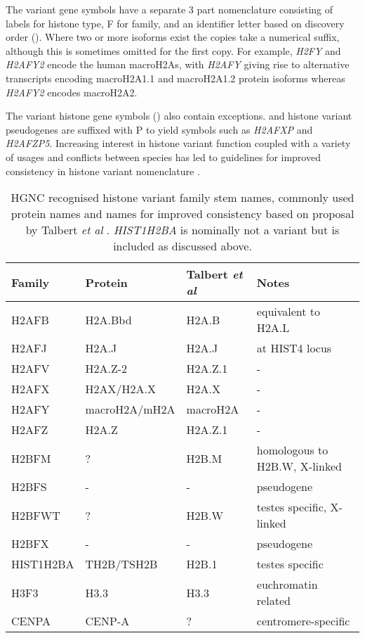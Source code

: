 	The variant gene symbols have a separate 3 part nomenclature 
	consisting of labels for histone type, F for family, 
	and an identifier letter based on discovery order ().
	Where two or more isoforms exist the copies take a numerical suffix, 
	although this is sometimes omitted for the first copy. 
	For example, \textit{H2FY} and \textit{H2AFY2} encode the human macroH2As, 
	with \textit{H2AFY} giving rise to alternative transcripts encoding macroH2A1.1 and macroH2A1.2 protein isoforms 
	whereas \textit{H2AFY2} encodes macroH2A2.

	The variant histone gene symbols () also contain exceptions.
	and histone variant pseudogenes are suffixed with P to yield symbols such as \textit{H2AFXP} and \textit{H2AFZP5}.
	Increasing interest in histone variant function \citep{MazeAllis2014}
	coupled with a variety of usages and conflicts between species 
	has led to guidelines for improved consistency in histone variant nomenclature \citep{Talbert2012}.

\begin{table*}[htp]
	\caption{HGNC recognised histone variant family stem names, commonly used protein names 
	and names for improved consistency based on proposal by Talbert \textit{et al} \citep{Talbert2012}. 
	\textit{HIST1H2BA} is nominally not a variant but is included as discussed above.}
	\label{tab:histone-variant-families}
	\centering
	\begin{tabular}{l l l l}
	\toprule
	Family & Protein & Talbert \textit{et al} & Notes \\
	\midrule
	H2AFB & H2A.Bbd & H2A.B & equivalent to H2A.L \\
	H2AFJ & H2A.J & H2A.J & at HIST4 locus \\
	H2AFV & H2A.Z-2 & H2A.Z.1 & - \\
	H2AFX & H2AX/H2A.X & H2A.X & - \\
	H2AFY & macroH2A/mH2A & macroH2A & - \\
	H2AFZ & H2A.Z & H2A.Z.1 & - \\
	H2BFM & ? & H2B.M & homologous to H2B.W, X-linked\\
	H2BFS & - & - & pseudogene \\
	H2BFWT & ? & H2B.W & testes specific, X-linked \\
	H2BFX & - & - & pseudogene \\
	HIST1H2BA & TH2B/TSH2B & H2B.1 & testes specific \\
	H3F3 & H3.3 & H3.3 & euchromatin related \\
	CENPA & CENP-A & ? & centromere-specific \\
	\bottomrule
	\end{tabular}
\end{table*}